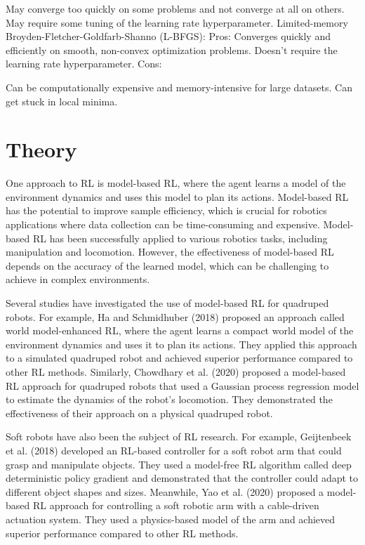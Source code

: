 May converge too quickly on some problems and not converge at all on others.
May require some tuning of the learning rate hyperparameter.
Limited-memory Broyden-Fletcher-Goldfarb-Shanno (L-BFGS):
Pros:
Converges quickly and efficiently on smooth, non-convex optimization problems.
Doesn't require the learning rate hyperparameter.
Cons:

Can be computationally expensive and memory-intensive for large datasets.
Can get stuck in local minima.

\section{Theory}

One approach to RL is model-based RL, where the agent learns a model of the environment dynamics and uses this model to plan its actions. Model-based RL has the potential to improve sample efficiency, which is crucial for robotics applications where data collection can be time-consuming and expensive. Model-based RL has been successfully applied to various robotics tasks, including manipulation and locomotion. However, the effectiveness of model-based RL depends on the accuracy of the learned model, which can be challenging to achieve in complex environments.

Several studies have investigated the use of model-based RL for quadruped robots. For example, Ha and Schmidhuber (2018) proposed an approach called world model-enhanced RL, where the agent learns a compact world model of the environment dynamics and uses it to plan its actions. They applied this approach to a simulated quadruped robot and achieved superior performance compared to other RL methods. Similarly, Chowdhary et al. (2020) proposed a model-based RL approach for quadruped robots that used a Gaussian process regression model to estimate the dynamics of the robot's locomotion. They demonstrated the effectiveness of their approach on a physical quadruped robot.

Soft robots have also been the subject of RL research. For example, Geijtenbeek et al. (2018) developed an RL-based controller for a soft robot arm that could grasp and manipulate objects. They used a model-free RL algorithm called deep deterministic policy gradient and demonstrated that the controller could adapt to different object shapes and sizes. Meanwhile, Yao et al. (2020) proposed a model-based RL approach for controlling a soft robotic arm with a cable-driven actuation system. They used a physics-based model of the arm and achieved superior performance compared to other RL methods.

